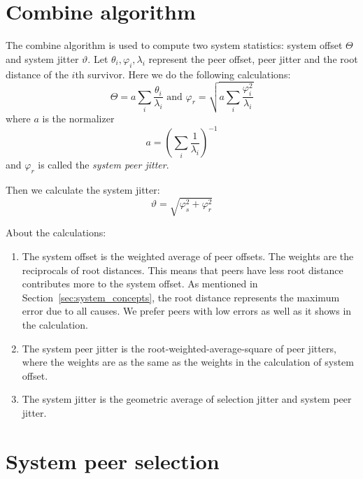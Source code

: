 \section{Combine algorithm}%
\label{sec:combine_algorithm}
The combine algorithm is used to compute two system statistics: system offset 
$\Theta$ and system jitter $\vartheta$. Let $\theta_i, \varphi_i, \lambda_i$
represent the peer offset, peer jitter and the root distance of the $i$th
survivor. Here we do the following calculations:~\cite{redbook}
\begin{equation}
    \Theta = a \sum^{}_{i} \frac{\theta_i}{\lambda_i} \text{ and } 
    \varphi_r = \sqrt{a \sum^{}_{i} \frac{\varphi_i ^ 2}{\lambda_i}}
    \label{eq:system_offset_selection_jitter}
\end{equation}
where $a$ is the normalizer
\begin{equation}
    a = \left( \sum^{}_{i} \frac{1}{\lambda_i} \right) ^ {-1}
    \label{eq:normalizer}
\end{equation}
and $\varphi_r$ is called the \emph{system peer jitter}.~\cite{rfc5905}

Then we calculate the system jitter:~\cite{redbook}
\begin{equation}
    \vartheta = \sqrt{\varphi_s^2 + \varphi_r^2}
    \label{eq:system_jitter}
\end{equation}

About the calculations:
\begin{enumerate}
    \item The system offset is the weighted average of peer offsets. The
        weights are the reciprocals of root distances. This means that peers
        have less root distance contributes more to the system offset. As
        mentioned in Section~\ref{sec:system_concepts}, the root distance
        represents the maximum error due to all causes. We prefer peers with
        low errors as well as it shows in the calculation.
    \item The system peer jitter is the root-weighted-average-square of peer
        jitters, where the weights are as the same as the weights in the
        calculation of system offset.
    \item The system jitter is the geometric average of selection jitter and
        system peer jitter.
\end{enumerate}

\section{System peer selection}%
\label{sec:system_peer_selection}


